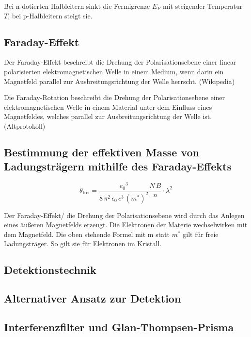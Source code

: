 Bei n-dotierten Halbleitern sinkt die Fermigrenze $E_F$ mit steigender Temperatur $T$, bei p-Halbleitern steigt sie. \cite{demtroeder}

\subsection{Faraday-Effekt}
Der Faraday-Effekt beschreibt die Drehung der Polarisationsebene einer linear polarisierten elektromagnetischen Welle in einem Medium, wenn darin ein Magnetfeld parallel zur Ausbreitungsrichtung der Welle herrscht. (Wikipedia)

Die Faraday-Rotation beschreibt die Drehung der Polarisationsebene einer elektromagnetischen Welle in einem Material unter dem Einfluss eines Magnetfeldes, welches parallel zur Ausbreitungsrichtung der Welle ist. (Altprotokoll)



\subsection{Bestimmung der effektiven Masse von Ladungsträgern mithilfe des Faraday-Effekts}
\begin{equation}
    \theta_\text{frei} = \frac{{e_0}^3}{8 \, \pi^2 \, \epsilon_0 \, c^3 \, (m^*)^2} \frac{N \, B}{n} \cdot \lambda^2
    \label{eq:theta}
\end{equation}

Der Faraday-Effekt/ die Drehung der Polarisationsebene wird durch das Anlegen eines äußeren Magnetfelds erzeugt. Die Elektronen der Materie wechselwirken mit dem Magnetfeld.
Die oben stehende Formel mit m statt $m^*$ gilt für freie Ladungsträger. So gilt sie für Elektronen im Kristall.


\subsection{Detektionstechnik}

\subsection{Alternativer Ansatz zur Detektion}

\subsection{Interferenzfilter und Glan-Thompsen-Prisma}
